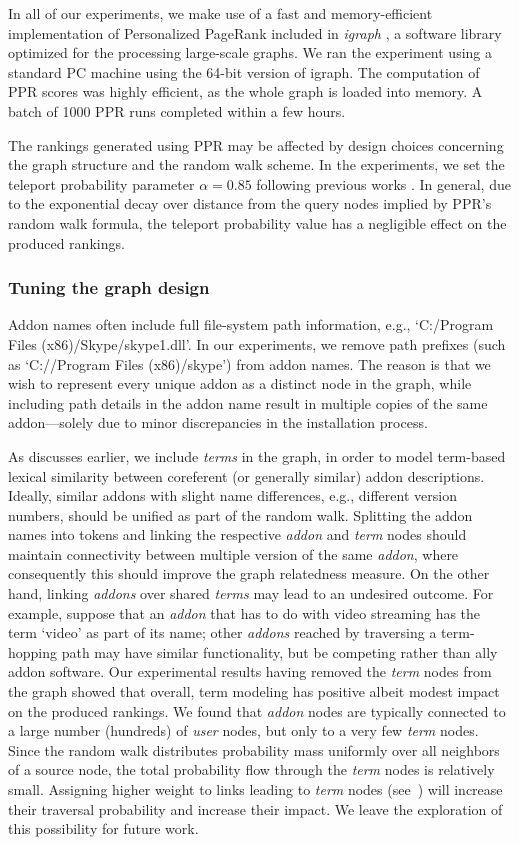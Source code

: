 \documentclass[ijoc,nonblindrev]{informs3} %
\numberwithin{equation}{subsection}
\begin{document}
In all of our experiments, we make use of a fast and memory-efficient implementation of Personalized PageRank included in {\it igraph} \citep{igraph}, a software library optimized for the processing large-scale graphs. We ran the experiment using a standard PC machine using the 64-bit version of igraph. The computation of PPR scores was highly efficient, as the whole graph is loaded into memory. A batch of 1000 PPR runs completed within a few hours.

The rankings generated using PPR may be affected by design choices concerning the graph structure and the random walk scheme. In the experiments, we set the teleport probability parameter $\alpha=0.85$ following previous works \citep{boldi2005totalrank}. In general, due to the exponential decay over distance from the query nodes implied by PPR's random walk formula, the teleport probability value has a negligible effect on the produced rankings.

\subsubsection{Tuning the graph design}

Addon names often include full file-system path information, e.g.,
`C:/Program Files (x86)/Skype/skype1.dll'. In our experiments, we remove path prefixes 
(such as `C://Program Files (x86)/skype') from addon names. The reason is that we wish to represent every unique addon as a distinct node in the graph, while including path details in the addon name result in multiple copies of the same addon---solely due to minor discrepancies in the installation process. 

As discusses earlier, we include {\it terms} in the graph, in order to model term-based lexical similarity between coreferent (or generally similar) addon descriptions. Ideally, similar addons with slight name differences, e.g., different version numbers, should be unified as part of the random walk. Splitting the addon names into tokens and linking the respective {\it addon} and {\it term} nodes should maintain connectivity between multiple version of the same {\it addon}, where consequently this should improve the graph relatedness measure. On the other hand, linking {\it addons} over shared {\it terms} may lead to an undesired outcome. For example, suppose that an {\it addon} that has to do with video streaming has the term `video' as part of its name; other {\it addons} reached by traversing a term-hopping path may have similar functionality, but be competing rather than ally addon software. Our experimental results having removed the {\it term} nodes from the graph showed that overall, term modeling has positive albeit modest impact on the produced rankings. We found that {\it addon} nodes are typically connected to a large number (hundreds) of {\it user} nodes, but only to a very few {\it term} nodes. Since the random walk distributes probability mass uniformly over all neighbors of a source node, the total probability flow through the {\it term} nodes is relatively small. Assigning higher weight to links leading to {\it term} nodes (see~\cite{minkov2010improving}) will increase their traversal probability and increase their impact. We leave the exploration of this possibility for future work.
\end{document}
